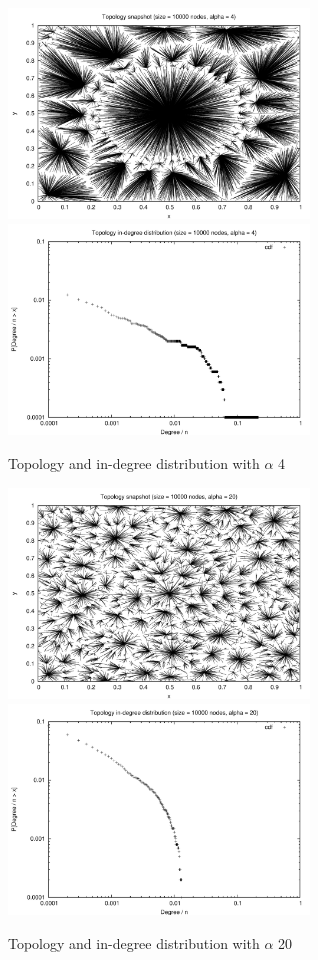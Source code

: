 \documentclass[a4paper,11pt]{article}
\begin{document}
\begin{figure}
\noindent
\includegraphics[width=8cm]{pic_alfa4}\hfill
\includegraphics[width=8cm]{picdegree_alfa4}
\caption{Topology and in-degree distribution with $\alpha$ 4\label{t4figure}}
\end{figure}

\begin{figure}
\noindent
\includegraphics[width=8cm]{pic_alfa20}\hfill
\includegraphics[width=8cm]{picdegree_alfa20}
\caption{Topology and in-degree distribution with $\alpha$ 20\label{t20figure}}
\end{figure}
\end{document}

